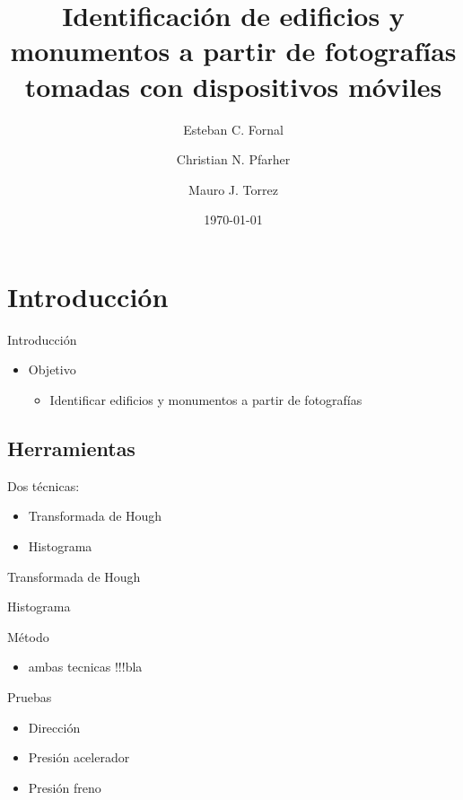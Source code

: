 \documentclass[spanish]{beamer}
\title{Identificación de edificios y monumentos a partir de fotografías tomadas 
con dispositivos móviles}
\author{Esteban C. Fornal \and Christian N. Pfarher \and Mauro J. Torrez}
\date{\today}
\begin{document}
%
\frame{\titlepage}

\section[Outline]{Introducción}
\begin{frame}{Introducción}
\begin{itemize}
\item<1-> Objetivo
\begin{itemize}
\item  Identificar edificios y monumentos a partir de fotografías
\end{itemize}
\end{itemize}
\end{frame}

\subsection[Outline]{Herramientas}
\begin{frame}{Dos técnicas:}
\begin{itemize}
\item<1-> Transformada de Hough
\item<2-> Histograma
\end{itemize}
\end{frame}

\begin{frame}{Transformada de Hough}
\end{frame}


\begin{frame}{Histograma}
\end{frame}


\begin{frame}{Método}
  \begin{itemize}
  \item ambas tecnicas !!!bla
  \end{itemize}
\end{frame}

\begin{frame}{Pruebas}
  \begin{itemize}
  \item Dirección %
  \item Presión acelerador %
  \item Presión freno%
  \end{itemize}
\end{frame}
\end{document}
